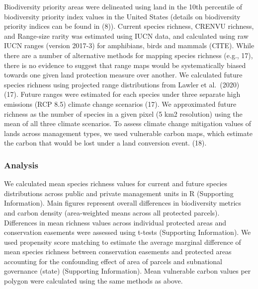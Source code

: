 \documentclass[3p]{elsarticle} %
\begin{document}
Biodiversity priority areas were delineated using land in the 10th
percentile of biodiversity priority index values in the United States
(details on biodiversity priority indices can be found in (8)). Current
species richness, CRENVU richness, and Range-size rarity was estimated
using IUCN data, and calculated using raw IUCN ranges (version 2017-3)
for amphibians, birds and mammals (CITE). While there are a number of
alternative methods for mapping species richness (e.g., 17), there is no
evidence to suggest that range maps would be systematically biased
towards one given land protection measure over another. We calculated
future species richness using projected range distributions from Lawler
et al.~(2020) (17). Future ranges were estimated for each species under
three separate high emissions (RCP 8.5) climate change scenarios (17).
We approximated future richness as the number of species in a given
pixel (5 km2 resolution) using the mean of all three climate scenarios.
To assess climate change mitigation values of lands across management
types, we used vulnerable carbon maps, which estimate the carbon that
would be lost under a land conversion event. (18).

\hypertarget{analysis}{%
\subsubsection{Analysis}\label{analysis}}

We calculated mean species richness values for current and future
species distributions across public and private management units in R
(Supporting Information). Main figures represent overall differences in
biodiversity metrics and carbon density (area-weighted means across all
protected parcels). Differences in mean richness values across
individual protected areas and conservation easements were assessed
using t-tests (Supporting Information). We used propensity score
matching to estimate the average marginal difference of mean species
richness between conservation easements and protected areas accounting
for the confounding effect of area of parcels and subnational governance
(state) (Supporting Information). Mean vulnerable carbon values per
polygon were calculated using the same methods as above.
\end{document}
